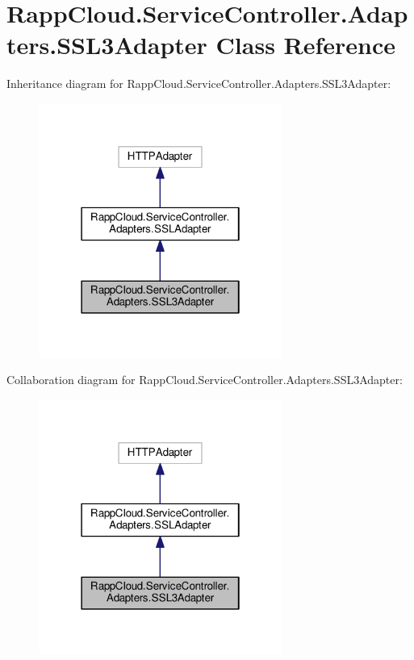 \hypertarget{classRappCloud_1_1ServiceController_1_1Adapters_1_1SSL3Adapter}{\section{Rapp\-Cloud.\-Service\-Controller.\-Adapters.\-S\-S\-L3\-Adapter Class Reference}
\label{classRappCloud_1_1ServiceController_1_1Adapters_1_1SSL3Adapter}
}


Inheritance diagram for Rapp\-Cloud.\-Service\-Controller.\-Adapters.\-S\-S\-L3\-Adapter\-:
\nopagebreak
\begin{figure}[H]
\begin{center}
\leavevmode
\includegraphics[width=226pt]{classRappCloud_1_1ServiceController_1_1Adapters_1_1SSL3Adapter__inherit__graph}
\end{center}
\end{figure}


Collaboration diagram for Rapp\-Cloud.\-Service\-Controller.\-Adapters.\-S\-S\-L3\-Adapter\-:
\nopagebreak
\begin{figure}[H]
\begin{center}
\leavevmode
\includegraphics[width=226pt]{classRappCloud_1_1ServiceController_1_1Adapters_1_1SSL3Adapter__coll__graph}
\end{center}
\end{figure}
